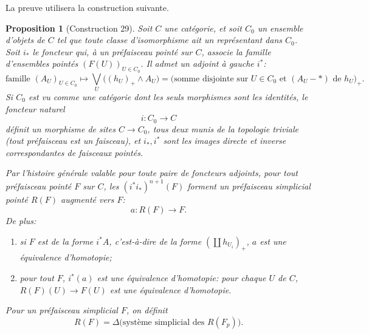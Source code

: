 \documentclass[11pt]{article}
\theoremstyle{deligne}
\newtheorem*{proposition*}{Proposition}
\begin{document}
La preuve utilisera la construction suivante.

\begin{proposition*}[Construction 29]
Soit \(C\) une catégorie, et soit \(C_0\) un ensemble d'objets de \(C\) tel que toute classe d'isomorphisme ait un représentant dans \(C_0\). Soit \(i_*\) le foncteur qui, à un préfaisceau pointé sur \(C\), associe la famille d'ensembles pointés \((F(U))_{U\in C_0}\). Il admet un adjoint à gauche \(i^*\):
\[
\text{famille }(A_U)_{U\in C_0}\longmapsto
\bigvee_U\bigl((h_U)_+\wedge A_U\bigr)
= \text{(somme disjointe sur }U\in C_0\text{ et }(A_U-* )\text{ de }h_U)_+ .
\]
Si \(C_0\) est vu comme une catégorie dont les seuls morphismes sont les identités, le foncteur naturel
\[
i:C_0\longrightarrow C
\]
définit un morphisme de sites \(C\to C_0\), tous deux munis de la topologie triviale (tout préfaisceau est un faisceau), et \(i_*,i^*\) sont les images directe et inverse correspondantes de faisceaux pointés.

Par l'histoire générale valable pour toute paire de foncteurs adjoints, pour tout préfaisceau pointé \(F\) sur \(C\), les \((i^*i_*)^{n+1}(F)\) forment un préfaisceau simplicial pointé \(R(F)\) augmenté vers \(F\):
\[
a:R(F)\longrightarrow F.
\]
De plus:
\begin{enumerate}[label=(\alph*)]
\item si \(F\) est de la forme \(i^*A\), c'est-à-dire de la forme \((\coprod h_{U_i})_+\), \(a\) est une équivalence d'homotopie;
\item pour tout \(F\), \(i^*(a)\) est une équivalence d'homotopie: pour chaque \(U\) de \(C\), \(R(F)(U)\to F(U)\) est une équivalence d'homotopie.
\end{enumerate}
Pour un préfaisceau simplicial \(F\), on définit
\[
R(F)=\Delta\bigl(\text{système simplicial des }R(F_p)\bigr).
\]
\end{proposition*}
\end{document}

